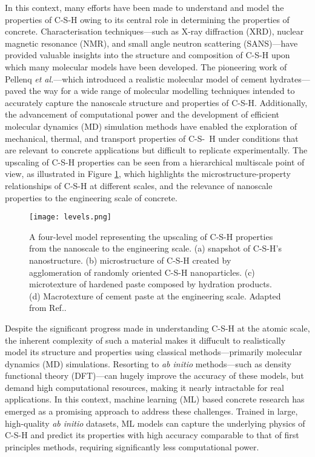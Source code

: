 In this context, many efforts have been made to understand and model the properties of C-S-H owing to its central role in determining the properties of concrete\supercite{Ji2012, Papatzani2015, Qomi2020}. Characterisation techniques---such as X-ray diffraction (XRD)\supercite{Allen2007, Houston2009, Oh2012}, nuclear magnetic resonance (NMR)\supercite{Foley2012, Maddalena2019}, and small angle neutron scattering (SANS)---have provided valuable insights into the structure and composition of C-S-H upon which many molecular models have been developed. The pioneering work of Pellenq \emph{et al.}\supercite{Pellenq2009}---which introduced a realistic molecular model of cement hydrates---paved the way for a wide range of molecular modelling techniques\supercite{AbdolhosseiniQomi2014, Richardson2014, Bauchy2014, Kovacevic2016, KunhiMohamed2018} intended to accurately capture the nanoscale structure and properties of C-S-H. Additionally, the advancement of computational power and the development of efficient molecular dynamics (MD) simulation methods have enabled the exploration of mechanical, thermal, and transport properties of C-S-~H\supercite{
AbdolhosseiniQomi2015, Bahraq2022, Cho2020, Barbhuiya2023} under conditions that are relevant to concrete applications but difficult to replicate experimentally. The upscaling of C-S-H properties can be seen from a hierarchical multiscale point of view, as illustrated in Figure \ref{fig:figure1}, which highlights the microstructure-property relationships of C-S-H at different scales, and the relevance of nanoscale properties to the engineering scale of concrete.
\begin{figure}[H]
    \centering
    \texttt{[image: levels.png]}
    \caption{A four-level model representing the upscaling of C-S-H properties from the nanoscale to the engineering scale. (a) snapshot of C-S-H's nanostructure. (b) microstructure of C-S-H created by agglomeration of randomly oriented C-S-H nanoparticles. (c) microtexture of hardened paste composed by hydration products. (d) Macrotexture of cement paste at the engineering scale. Adapted from Ref.\supercite{AbdolhosseiniQomi2015}.}
    \label{fig:figure1}
\end{figure}

Despite the significant progress made in understanding C-S-H at the atomic scale, the inherent complexity of such a material makes it diffucult to realistically model its structure and properties using classical methods---primarily molecular dynamics (MD) simulations. Resorting to \emph{ab initio} methods---such as density functional theory (DFT)---can hugely improve the accuracy of these models, but demand high computational resources, making it nearly intractable for real applications\supercite{zotero-item-16}. In this context, machine learning (ML) based concrete research has emerged as a promising approach to address these challenges\supercite{zotero-item-16, Kobayashi2021, Zhu2024}. Trained in large, high-quality \emph{ab initio} datasets, ML models can capture the underlying physics of C-S-H and predict its properties with high accuracy comparable to that of first principles methods, requiring significantly less computational power. 

